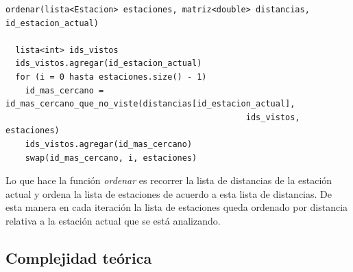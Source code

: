             \begin{codesnippet}
            \begin{verbatim}
ordenar(lista<Estacion> estaciones, matriz<double> distancias, id_estacion_actual)

  lista<int> ids_vistos
  ids_vistos.agregar(id_estacion_actual)
  for (i = 0 hasta estaciones.size() - 1)
    id_mas_cercano = id_mas_cercano_que_no_viste(distancias[id_estacion_actual], 
                                                 ids_vistos, estaciones)
    ids_vistos.agregar(id_mas_cercano)
    swap(id_mas_cercano, i, estaciones)
            \end{verbatim}
            \end{codesnippet}


Lo que hace la función \textit{ordenar} es recorrer la lista de distancias de la estación actual y ordena la lista de estaciones de acuerdo a esta lista de distancias. De esta manera en cada iteración la lista de estaciones queda ordenado por distancia relativa a la estación actual que se está analizando. 



            

    \subsection{Complejidad teórica}

